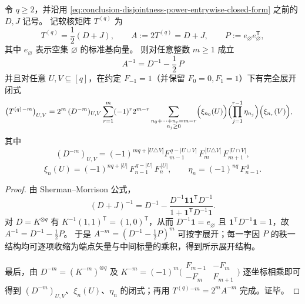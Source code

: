 \begin{theorem}\label{thm:conclusion-softcore-inverse-power-entrywise}
令 \(q\ge 2\)，并沿用 \eqref{eq:conclusion-disjointness-power-entrywise-closed-form} 之前的 \(D,J\) 记号。
记软核矩阵 \(T^{(q)}\) 为
\[
T^{(q)}=\frac12(D+J),
\qquad
A:=2T^{(q)}=D+J,
\qquad
P:=e_{\varnothing}e_{\varnothing}^{\mathsf T},
\]
其中 \(e_{\varnothing}\) 表示空集 \(\varnothing\) 的标准基向量。
则对任意整数 \(m\ge 1\) 成立
\[
\boxed{\;A^{-1}=D^{-1}-\frac12\,P\;}
\]
并且对任意 \(U,V\subseteq[q]\)，在约定 \(F_{-1}=1\)（并保留 \(F_0=0,F_1=1\)）下有完全展开闭式
\begin{align*}
\bigl(T^{(q)}{}^{-m}\bigr)_{U,V}
&=
2^{m}\,(D^{-m})_{U,V}
\sum_{r=1}^{m}(-1)^{r}2^{m-r}
\sum_{\substack{n_0+\cdots+n_r=m-r\\ n_j\ge 0}}
\Bigl(\xi_{n_0}(U)\Bigr)\Bigl(\prod_{j=1}^{r-1}\eta_{n_j}\Bigr)\Bigl(\xi_{n_r}(V)\Bigr),
\end{align*}
其中
\[
(D^{-m})_{U,V}=(-1)^{mq+|U\triangle V|}
F_{m-1}^{\,q-|U\cup V|}\,F_{m}^{\,|U\triangle V|}\,F_{m+1}^{\,|U\cap V|},
\]
\[
\xi_n(U)=(-1)^{nq+|U|}\,F_{n-1}^{\,q-|U|}\,F_{n}^{\,|U|},
\qquad
\eta_n=(-1)^{nq}\,F_{n-1}^{\,q}.
\]
\end{theorem}
\begin{proof}
由 Sherman--Morrison 公式，
\[
(D+J)^{-1}=D^{-1}-\frac{D^{-1}\mathbf 1\mathbf 1^{\mathsf T}D^{-1}}{1+\mathbf 1^{\mathsf T}D^{-1}\mathbf 1}.
\]
对 \(D=K^{\otimes q}\) 有 \(K^{-1}(1,1)^{\mathsf T}=(1,0)^{\mathsf T}\)，从而 \(D^{-1}\mathbf 1=e_{\varnothing}\) 且 \(\mathbf 1^{\mathsf T}D^{-1}\mathbf 1=1\)，故 \(A^{-1}=D^{-1}-\frac12P\)。
于是 \(A^{-m}=(D^{-1}-\tfrac12P)^m\) 可按字展开；每一字因 \(P\) 的秩一结构均可逐项收缩为端点矢量与中间标量的乘积，得到所示展开结构。
\par
最后，由 \(D^{-m}=(K^{-m})^{\otimes q}\) 及
\(
K^{-m}=(-1)^m\bigl(\begin{smallmatrix}F_{m-1}&-F_m\\[2pt]-F_m&F_{m+1}\end{smallmatrix}\bigr)
\)
逐坐标相乘即可得到 \((D^{-m})_{U,V}\)、\(\xi_n(U)\)、\(\eta_n\) 的闭式；再用 \(T^{(q)}{}^{-m}=2^{m}A^{-m}\) 完成。证毕。
\end{proof}


\endinput
